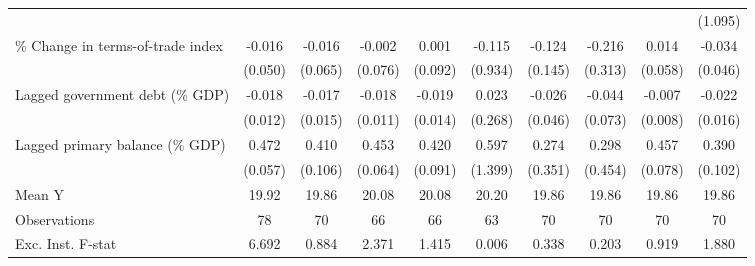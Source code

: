 {\begin{tabular}{l*{9}{c}}
                    &                     &                     &                     &                     &                     &                     &                     &                     &     (1.095)         \\
\addlinespace
\% Change in terms-of-trade index&      -0.016         &      -0.016         &      -0.002         &       0.001         &      -0.115         &      -0.124         &      -0.216         &       0.014         &      -0.034         \\
                    &     (0.050)         &     (0.065)         &     (0.076)         &     (0.092)         &     (0.934)         &     (0.145)         &     (0.313)         &     (0.058)         &     (0.046)         \\
\addlinespace
Lagged government debt (\% GDP)&      -0.018         &      -0.017         &      -0.018         &      -0.019         &       0.023         &      -0.026         &      -0.044         &      -0.007         &      -0.022         \\
                    &     (0.012)         &     (0.015)         &     (0.011)         &     (0.014)         &     (0.268)         &     (0.046)         &     (0.073)         &     (0.008)         &     (0.016)         \\
\addlinespace
Lagged primary balance (\% GDP)&       0.472\sym{***}&       0.410\sym{***}&       0.453\sym{***}&       0.420\sym{***}&       0.597         &       0.274         &       0.298         &       0.457\sym{***}&       0.390\sym{***}\\
                    &     (0.057)         &     (0.106)         &     (0.064)         &     (0.091)         &     (1.399)         &     (0.351)         &     (0.454)         &     (0.078)         &     (0.102)         \\
\midrule
Mean Y              &       19.92         &       19.86         &       20.08         &       20.08         &       20.20         &       19.86         &       19.86         &       19.86         &       19.86         \\
Observations        &          78         &          70         &          66         &          66         &          63         &          70         &          70         &          70         &          70         \\
Exc. Inst. F-stat   &       6.692         &       0.884         &       2.371         &       1.415         &       0.006         &       0.338         &       0.203         &       0.919         &       1.880         \\
\bottomrule
\end{tabular}
}
